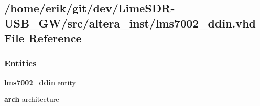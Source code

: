\subsection{/home/erik/git/dev/\+Lime\+S\+D\+R-\/\+U\+S\+B\+\_\+\+G\+W/src/altera\+\_\+inst/lms7002\+\_\+ddin.vhd File Reference}
\label{altera__inst_2lms7002__ddin_8vhd}
\subsubsection*{Entities}
\begin{DoxyCompactItemize}
\item 
{\bf lms7002\+\_\+ddin} entity
\item 
{\bf arch} architecture
\end{DoxyCompactItemize}
